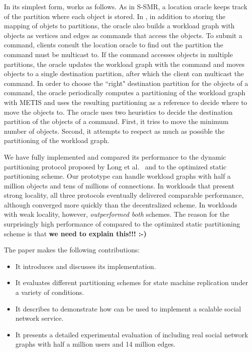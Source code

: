 %
In its simplest form, \dynastar works as follows.  As in S-SMR, a
location oracle keeps track of the partition where each object is
stored.  In \dynastar, in addition to storing the mapping of objets to
partitions, the oracle also builds a workload graph with objects as
vertices and edges as commands that access the objects.  To submit a
command, clients consult the location oracle to find out the partition
the command must be multicast to.  If the command accesses objects in
multiple partitions, the oracle updates the workload graph with the
command and moves objects to a single destination partition, after
which the client can multicast the command.  In order to choose the
``right" destination partition for the objects of a command, the
oracle periodically computes a partitioning of the workload graph with
METIS and uses the resulting partitioning as a reference to decide
where to move the objects to.  The oracle uses two heuristics to
decide the destination partition of the objects of a command.  First,
it tries to move the minimum number of objects.  Second, it attempts
to respect as much as possible the partitioning of the workload graph.

We have fully implemented \dynastar and compared its performance to
the dynamic partitioning protocol proposed by Long et
al.~\cite{hoang2016} and to the optimized static partitioning scheme.
Our prototype can handle workload graphs with half a million objects
and tens of millions of connections.  In workloads that present strong
locality, all three protocols eventually delivered comparable
performance, although \dynastar converged more quickly than the
decentralized scheme.  In workloads with weak locality, however,
\dynastar \emph{outperformed both} schemes.  The reason for the
surprisingly high performance of \dynastar compared to the optimized
static partitioning scheme is that \textbf{we need to explain this!!!
  :-)}

The paper makes the following contributions:
\begin{itemize}
\item It introduces \dynastar and discusses its implementation. 
\item It evaluates different partitioning schemes for state machine replication under a variety of conditions.
\item It describes \appname{} to demonstrate how \libname{} can be used to implement a scalable social network service.
\item It presents a detailed experimental evaluation of \dynastar including real social network graphs with half a million users and 14 million edges.
\end{itemize}

